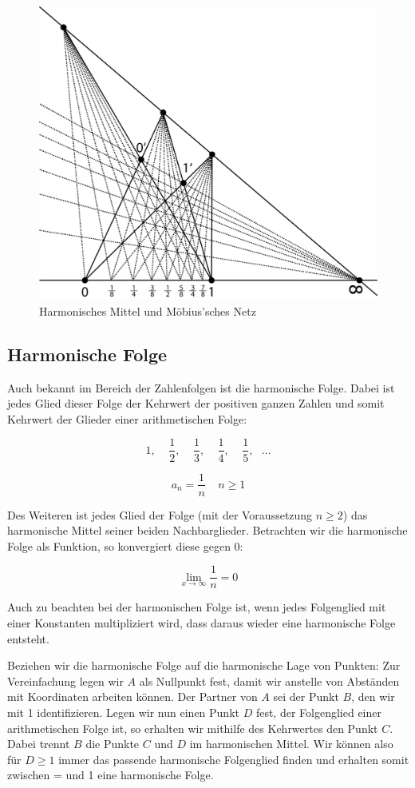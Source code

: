 \documentclass[12pt,a4paper]{article}
\begin{document}
\begin{figure}[htbp] 
\centering
\includegraphics[width=\textwidth]{Bilder/harmMittel.png}
\caption{Harmonisches Mittel und Möbius'sches Netz}
\label{fig:harmMittel}
\end{figure}

\subsection{Harmonische Folge}

Auch bekannt im Bereich der Zahlenfolgen ist die harmonische Folge. Dabei ist jedes Glied dieser Folge der Kehrwert der positiven ganzen Zahlen und somit Kehrwert der Glieder einer arithmetischen Folge: 

\[ 1,~~~~~\dfrac{1}{2},~~~~~\dfrac{1}{3},~~~~~\dfrac{1}{4},~~~~~\dfrac{1}{5},~~~\dots\]

\[ a_n = \dfrac{1}{n} ~~~~~ n \geq 1\]

Des Weiteren ist jedes Glied der Folge (mit der Voraussetzung $n \geq 2$) das harmonische Mittel seiner beiden Nachbarglieder. Betrachten wir die harmonische Folge als Funktion, so konvergiert diese gegen 0:

\[ \lim_{x \to \infty} \dfrac{1}{n} = 0\]

Auch zu beachten bei der harmonischen Folge ist, wenn jedes Folgenglied mit einer Konstanten multipliziert wird, dass daraus wieder eine harmonische Folge entsteht.

Beziehen wir die harmonische Folge auf die harmonische Lage von Punkten: Zur Vereinfachung legen wir $A$ als Nullpunkt fest, damit wir anstelle von Abständen mit Koordinaten arbeiten können. Der Partner von $A$ sei der Punkt $B$, den wir mit 1 identifizieren. Legen wir nun einen Punkt $D$ fest, der Folgenglied einer arithmetischen Folge ist, so erhalten wir mithilfe des Kehrwertes den Punkt $C$. Dabei trennt $B$ die Punkte $C$ und $D$ im harmonischen Mittel. Wir können also für $D \geq 1$ immer das passende harmonische Folgenglied finden und erhalten somit zwischen = und 1 eine harmonische Folge.
\end{document}
